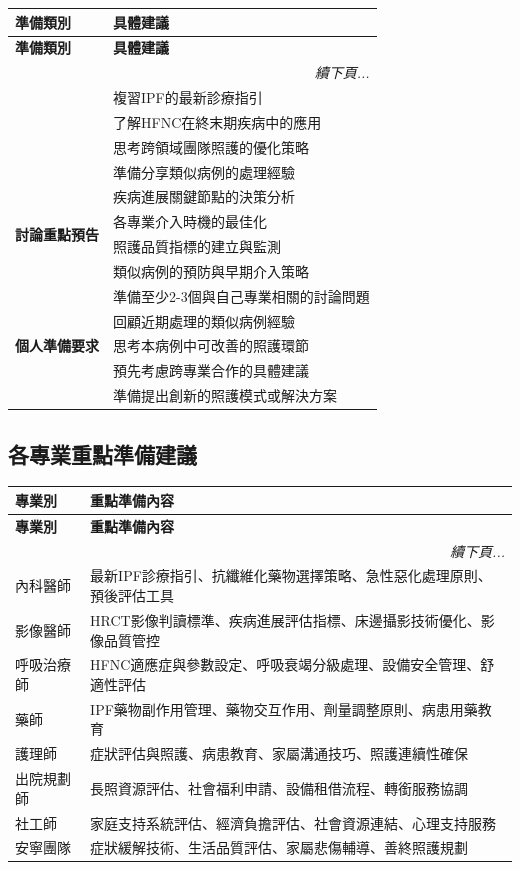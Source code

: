 \documentclass{article}
\begin{document}
\begin{longtable}{p{4cm} p{11cm}}
\toprule
\textbf{準備類別} & \textbf{具體建議} \\
\midrule
\endfirsthead
\toprule
\textbf{準備類別} & \textbf{具體建議} \\
\midrule
\endhead
\midrule
\multicolumn{2}{r}{\textit{續下頁...}} \\
\endfoot
\bottomrule
\endlastfoot

\multirow{4}{4cm}{\textbf{建議準備方向}} & 複習IPF的最新診療指引 \\
 & 了解HFNC在終末期疾病中的應用 \\
 & 思考跨領域團隊照護的優化策略 \\
 & 準備分享類似病例的處理經驗 \\

\multirow{4}{4cm}{\textbf{討論重點預告}} & 疾病進展關鍵節點的決策分析 \\
 & 各專業介入時機的最佳化 \\
 & 照護品質指標的建立與監測 \\
 & 類似病例的預防與早期介入策略 \\

\multirow{5}{4cm}{\textbf{個人準備要求}} & 準備至少2-3個與自己專業相關的討論問題 \\
 & 回顧近期處理的類似病例經驗 \\
 & 思考本病例中可改善的照護環節 \\
 & 預先考慮跨專業合作的具體建議 \\
 & 準備提出創新的照護模式或解決方案 \\
\end{longtable}

\subsection{各專業重點準備建議}

\begin{longtable}{p{3cm} p{12cm}}
\toprule
\textbf{專業別} & \textbf{重點準備內容} \\
\midrule
\endfirsthead
\toprule
\textbf{專業別} & \textbf{重點準備內容} \\
\midrule
\endhead
\midrule
\multicolumn{2}{r}{\textit{續下頁...}} \\
\endfoot
\bottomrule
\endlastfoot

內科醫師 & 最新IPF診療指引、抗纖維化藥物選擇策略、急性惡化處理原則、預後評估工具 \\
影像醫師 & HRCT影像判讀標準、疾病進展評估指標、床邊攝影技術優化、影像品質管控 \\
呼吸治療師 & HFNC適應症與參數設定、呼吸衰竭分級處理、設備安全管理、舒適性評估 \\
藥師 & IPF藥物副作用管理、藥物交互作用、劑量調整原則、病患用藥教育 \\
護理師 & 症狀評估與照護、病患教育、家屬溝通技巧、照護連續性確保 \\
出院規劃師 & 長照資源評估、社會福利申請、設備租借流程、轉銜服務協調 \\
社工師 & 家庭支持系統評估、經濟負擔評估、社會資源連結、心理支持服務 \\
安寧團隊 & 症狀緩解技術、生活品質評估、家屬悲傷輔導、善終照護規劃 \\
\end{longtable}
\end{document}
